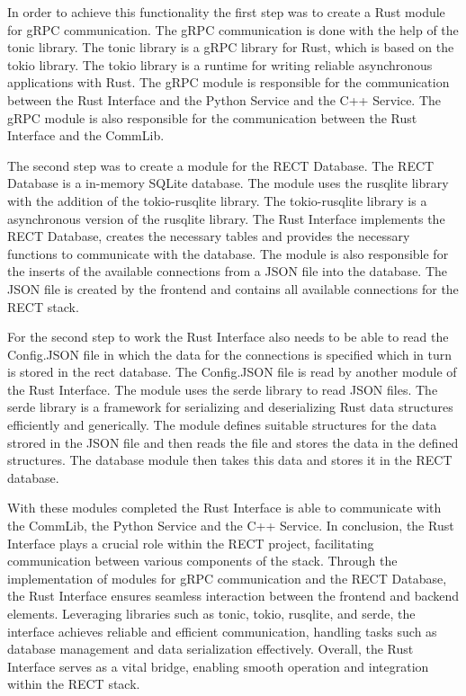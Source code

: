 In order to achieve this functionality the first step was to create a Rust module for gRPC communication. The gRPC communication is done with the help of the tonic library.
The tonic library is a gRPC library for Rust, which is based on the tokio library. The tokio library is a runtime for writing reliable asynchronous applications with Rust.
The gRPC module is responsible for the communication between the Rust Interface and the Python Service and the C++ Service. The gRPC module is also responsible for the 
communication between the Rust Interface and the CommLib.\newline 

The second step was to create a module for the RECT Database. The RECT Database is a in-memory SQLite database. The module uses the rusqlite library with the addition of
the tokio-rusqlite library. The tokio-rusqlite library is a asynchronous version of the rusqlite library. The Rust Interface implements the RECT Database, creates the 
necessary tables and provides the necessary functions to communicate with the database. The module is also responsible for the inserts of the available connections from a
JSON file into the database. The JSON file is created by the frontend and contains all available connections for the RECT stack.\newline

For the second step to work the Rust Interface also needs to be able to read the Config.JSON file in which the data for the connections is specified which in turn is stored 
in the rect database. The Config.JSON file is read by another module of the Rust Interface. The module uses the serde library to read JSON files. The serde library is a 
framework for serializing and deserializing Rust data structures efficiently and generically. The module defines suitable structures for the data strored in the JSON file 
and then reads the file and stores the data in the defined structures. The database module then takes this data and stores it in the RECT database.\newline

With these modules completed the Rust Interface is able to communicate with the CommLib, the Python Service and the C++ Service. In conclusion, the Rust Interface plays a 
crucial role within the RECT project, facilitating communication between various components of the stack. Through the implementation of modules for gRPC communication and 
the RECT Database, the Rust Interface ensures seamless interaction between the frontend and backend elements. Leveraging libraries such as tonic, tokio, rusqlite, and 
serde, the interface achieves reliable and efficient communication, handling tasks such as database management and data serialization effectively. Overall, the Rust 
Interface serves as a vital bridge, enabling smooth operation and integration within the RECT stack.

